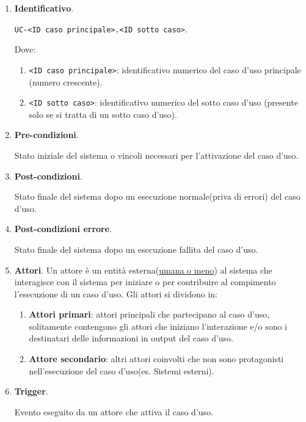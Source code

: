 \begin{enumerate}
    \item \textbf{Identificativo}.
    
    \texttt{UC-<ID caso principale>.<ID sotto caso>}. 
    
    Dove:
    \begin{enumerate}
        \item \texttt{<ID caso principale>}: identificativo numerico del caso d'uso principale (numero crescente).

        \item \texttt{<ID sotto caso>}: identificativo numerico del sotto caso d'uso (presente solo se si tratta di un sotto caso d'uso).
    \end{enumerate}

    \item \textbf{Pre-condizioni}.
    
    Stato iniziale del sistema o vincoli necessari per l'attivazione del caso d'uso.

    \item \textbf{Post-condizioni}.
    
    Stato finale del sistema dopo un esecuzione normale(priva di errori) del caso d'uso.

    \item \textbf{Post-condizioni errore}.
    
    Stato finale del sistema dopo un esecuzione fallita del caso d'uso.

    \item \textbf{Attori}.
    Un attore è un entità esterna(\underline{umana o meno}) al sistema che interagisce con il sistema per iniziare o per contribuire al compimento l'esecuzione di un caso d'uso.  
    Gli attori si dividono in:
    \begin{enumerate}
        \item  \textbf{Attori primari}: attori principali che partecipano al caso d'uso, solitamente contengono gli attori che iniziano l'interazione e/o sono i destinatari delle informazioni in output del caso d'uso.
        \item \textbf{Attore secondario}: altri attori coinvolti che non sono protagonisti nell'esecuzione del caso d'uso(es. Sistemi esterni).
    \end{enumerate}

    \item \textbf{Trigger}.
    
    Evento eseguito da un attore che attiva il caso d'uso.
    

\end{enumerate}
